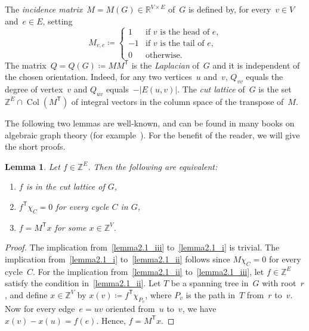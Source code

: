 \documentclass[10pt]{amsart}
\newtheorem{lemma}[theorem]{Lemma}
\newcommand{\Z}{\ensuremath{\mathbb{Z}}}
\newcommand{\R}{\ensuremath{\mathbb{R}}}
\newcommand{\transp}{\mathsf{T}}
\DeclareMathOperator{\Col}{Col}
\begin{document}
The \emph{incidence matrix}~$M=M(G)\in \R^{V\times E}$ of~$G$ is defined by, for every~$v\in V$ and~$e\in E$, setting 
\begin{equation}
M_{v,e}\coloneqq 
\begin{cases}
1&\text{if $v$ is the head of $e$,}\\
-1&\text{if $v$ is the tail of $e$,}\\
0&\text{otherwise.}
\end{cases}
\end{equation}
\noindent The matrix~$Q=Q(G)\coloneqq MM^\transp$ is the \emph{Laplacian} of~$G$ and it is independent of the chosen orientation. Indeed, for any two vertices~$u$ and~$v$, $Q_{vv}$ equals the degree of vertex~$v$ and $Q_{uv}$ equals~$-|E(u,v)|$. The \emph{cut lattice} of~$G$ is the set~$\Z^{E}\cap \Col(M^\transp)$ of integral vectors in the column space of the transpose of~$M$. 

The following two lemmas are well-known, and can be found in many books on algebraic graph theory (for example~\cite{GodsilRoyle2001}). For the benefit of the reader, we will give the short proofs.
 
\begin{lemma}\label{clattice}
Let $f\in \Z^{E}$. Then the following are equivalent:
\begin{enumerate}[label=(\roman*)]
\item\label{lemma2.1_i} $f$ is in the cut lattice of $G$,
\item\label{lemma2.1_ii} $f^\transp\chi_C=0$ for every cycle $C$ in $G$,
\item\label{lemma2.1_iii} $f=M^\transp x$ for some $x\in \Z^{V}$.
\end{enumerate}
\end{lemma} 
\begin{proof}
The implication from~\ref{lemma2.1_iii} to~\ref{lemma2.1_i} is trivial. The implication from~\ref{lemma2.1_i} to~\ref{lemma2.1_ii} follows since $M\chi_C=0$ for every cycle~$C$. For the implication from~\ref{lemma2.1_ii} to~\ref{lemma2.1_iii}, let $f\in \Z^{E}$ satisfy the condition in~\ref{lemma2.1_ii}. Let $T$ be a spanning tree in~$G$ with root~$r$, and define $x\in \Z^V$ by $x(v)\coloneqq f^\transp\chi_{P_v}$, where $P_v$ is the path in~$T$ from~$r$ to~$v$. Now for every edge~$e=uv$ oriented from~$u$ to~$v$, we have $x(v)-x(u)=f(e)$. Hence, $f=M^\transp x$.
\end{proof}
\end{document}
